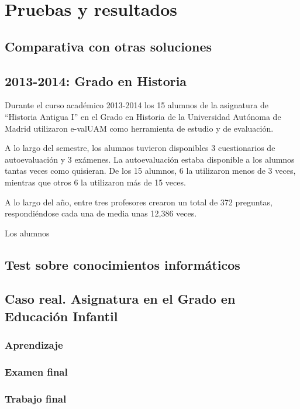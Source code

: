 \chapter{Pruebas y resultados\label{sec:pruebasYResultados}}


\section{Comparativa con otras soluciones}

\section{2013-2014: Grado en Historia}

Durante el curso académico 2013-2014 los 15 alumnos de la asignatura de ``Historia Antigua I'' en el Grado en Historia de la Universidad Autónoma de Madrid utilizaron e-valUAM como herramienta de estudio y de evaluación.

A lo largo del semestre, los alumnos tuvieron disponibles 3 cuestionarios de autoevaluación y 3 exámenes. La autoevaluación estaba disponible a los alumnos tantas veces como quisieran. De los 15 alumnos, 6 la utilizaron menos de 3 veces, mientras que otros 6 la utilizaron más de 15 veces. 

A lo largo del año, entre tres profesores crearon un total de 372 preguntas, respondiéndose cada una de media unas 12,386 veces.

Los alumnos 

\section{Test sobre conocimientos informáticos}



\section{Caso real. Asignatura en el Grado en Educación Infantil}

\subsection{Aprendizaje}
\subsection{Examen final}
\subsection{Trabajo final}